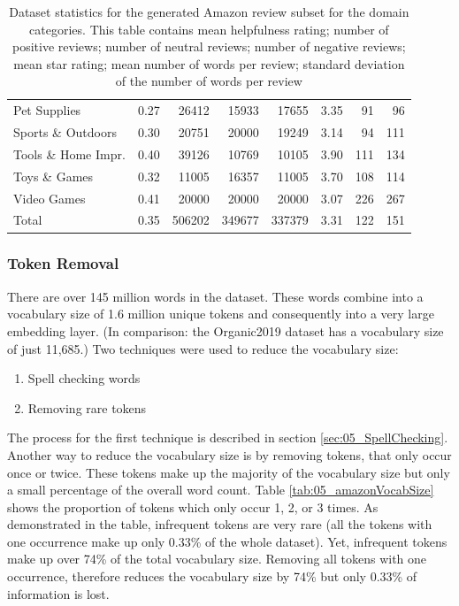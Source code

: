 \begin{table}
\begin{tabularx}{\textwidth}{lXrrrcrr}
		Pet Supplies                &   0.27 &  26412 & 15933 & 17655 &    3.35 &     91 &   96 \\
		Sports \& Outdoors          &   0.30 &  20751 & 20000 & 19249 &    3.14 &     94 &  111 \\
		Tools \& Home Impr.  		&   0.40 &  39126 & 10769 & 10105 &    3.90 &    111 &  134 \\
		Toys \& Games               &   0.32 &  11005 & 16357 & 11005 &    3.70 &    108 &  114 \\
		Video Games                 &   0.41 &   20000 &  	20000 & 20000 &    3.07 &    226 &  267 \\
		\midrule
		Total						&	0.35 & 	   506202 &	349677& 337379&    3.31 &	 122 &  151 \\
		\bottomrule
	\end{tabularx}
	\caption{Dataset statistics for the generated Amazon review subset for the domain categories. This table contains mean helpfulness rating; number of positive reviews; number of neutral reviews; number of negative reviews; mean star rating; mean number of words per review; standard deviation of the number of words per review }
		\label{tab:05_amazonDatasetStats}
\end{table}

\subsubsection*{Token Removal}
There are over 145 million words in the dataset. These words combine into a vocabulary size of 1.6 million unique tokens and consequently into a very large embedding layer. {(In comparison: the Organic2019 dataset has a vocabulary size of just 11,685.)} Two techniques were used to reduce the vocabulary size:

\begin{enumerate}
	\item Spell checking words
	\item Removing rare tokens
\end{enumerate}

The process for the first technique is described in section \ref{sec:05_SpellChecking}. Another way to reduce the vocabulary size is by removing tokens, that only occur once or twice. These tokens make up the majority of the vocabulary size but only a small percentage of the overall word count. Table \ref{tab:05_amazonVocabSize} shows the proportion of tokens which only occur 1, 2, or 3 times. As demonstrated in the table, infrequent tokens are very rare {(all the tokens with one occurrence make up only 0.33\% of the whole dataset)}. Yet, infrequent tokens make up over 74\% of the total vocabulary size. Removing all tokens with one occurrence, therefore reduces the vocabulary size by 74\% but only 0.33\% of information is lost.

